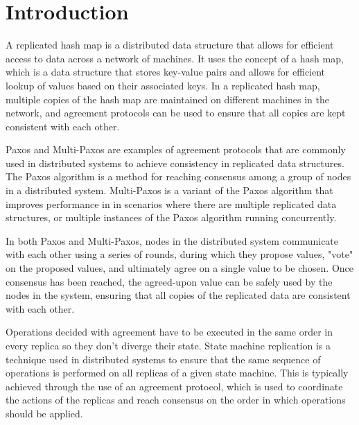 \documentclass[sigconf]{acmart}
\begin{document}
\maketitle

\section{Introduction}

A replicated hash map is a distributed data structure that allows for efficient access to data across a network of machines. It uses the concept of a hash map, which is a data structure that stores key-value pairs and allows for efficient lookup of values based on their associated keys. In a replicated hash map, multiple copies of the hash map are maintained on different machines in the network, and agreement protocols can be used to ensure that all copies are kept consistent with each other.

Paxos \cite{leslie1998part} \cite{lamport2001paxos} \cite{van2015paxos} and Multi-Paxos \cite{lamport2001paxos} \cite{du2009multi} \cite{van2015paxos} are examples of agreement protocols that are commonly used in distributed systems to achieve consistency in replicated data structures. The Paxos algorithm is a method for reaching consensus among a group of nodes in a distributed system. Multi-Paxos is a variant of the Paxos algorithm that improves performance in in scenarios where there are multiple replicated data structures, or multiple instances of the Paxos algorithm running concurrently.

In both Paxos and Multi-Paxos, nodes in the distributed system communicate with each other using a series of rounds, during which they propose values, "vote" on the proposed values, and ultimately agree on a single value to be chosen. Once consensus has been reached, the agreed-upon value can be safely used by the nodes in the system, ensuring that all copies of the replicated data are consistent with each other.

Operations decided with agreement have to be executed in the same order in every replica so they don't diverge their state. State machine replication is a technique used in distributed systems to ensure that the same sequence of operations is performed on all replicas of a given state machine. This is typically achieved through the use of an agreement protocol, which is used to coordinate the actions of the replicas and reach consensus on the order in which operations should be applied.
\end{document}
